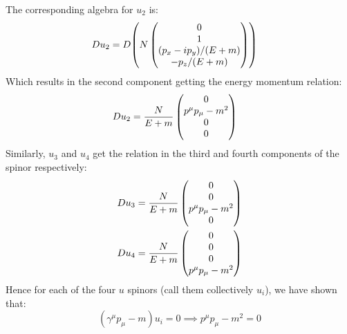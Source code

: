 \documentclass[12pt]{article}
\begin{document}
The corresponding algebra for $u_2$ is:
\begin{align*}
  D u_2&= D \qty(N\pmqty{0\\1\\(p_x-ip_y)/(E+m)\\-p_z/(E+m)})
\end{align*}
Which results in the second component getting the energy momentum relation:
\begin{align*}
  D u_2&=\frac{N}{E+m}\pmqty{0\\p^\mu p_\mu-m^2\\0\\0}
\end{align*}
Similarly, $u_3$ and $u_4$ get the relation in the third and fourth components of the spinor respectively:
\begin{align*}
  D u_3&=\frac{N}{E+m}\pmqty{0\\0\\p^\mu p_\mu-m^2\\0}\\
  D u_4&=\frac{N}{E+m}\pmqty{0\\0\\0\\p^\mu p_\mu-m^2}
\end{align*}
Hence for each of the four $u$ spinors (call them collectively $u_i$), we have shown that:
\begin{equation}
  \label{eq:p2}
  \boxed{(\gamma^\mu p_\mu-m)u_i=0\implies p^\mu p_\mu-m^2=0}
\end{equation}
\newpage
\end{document}
